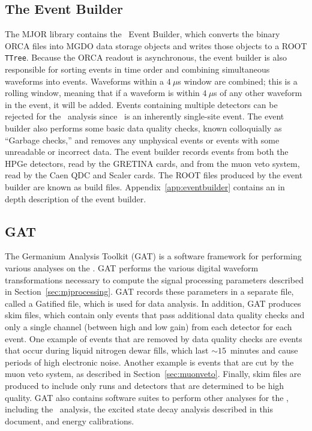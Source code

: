 \documentclass[/main.tex]{subfiles}
\begin{document}
\subsection{The Event Builder}\label{sec:eventbuilder}
The MJOR library contains the \MJ\ Event Builder, which converts the binary ORCA files into MGDO data storage objects and writes those objects to a ROOT \texttt{TTree}.
Because the ORCA readout is asynchronous, the event builder is also responsible for sorting events in time order and combining simultaneous waveforms into events.
Waveforms within a $4~\mu$s window are combined; this is a rolling window, meaning that if a waveform is within $4~\mu$s of any other waveform in the event, it will be added.
Events containing multiple detectors can be rejected for the \znbb\ analysis since \znbb\ is an inherently single-site event.
The event builder also performs some basic data quality checks, known colloquially as ``Garbage checks,'' and removes any unphysical events or events with some unreadable or incorrect data.
The event builder records events from both the HPGe detectors, read by the GRETINA cards, and from the muon veto system, read by the Caen QDC and Scaler cards.
The ROOT files produced by the event builder are known as build files.
Appendix~\ref{app:eventbuilder} contains an in depth description of the event builder.

\subsection{GAT}
The Germanium Analysis Toolkit (GAT) is a software framework for performing various analyses on the \MJD.
GAT performs the various digital waveform transformations necessary to compute the signal processing parameters described in Section~\ref{sec:mjprocessing}.
GAT records these parameters in a separate file, called a Gatified file, which is used for data analysis.
In addition, GAT produces skim files, which contain only events that pass additional data quality checks and only a single channel (between high and low gain) from each detector for each event.
One example of events that are removed by data quality checks are events that occur during liquid nitrogen dewar fills, which last $\sim15$~minutes and cause periods of high electronic noise.
Another example is events that are cut by the muon veto system, as described in Section~\ref{sec:muonveto}.
Finally, skim files are produced to include only runs and detectors that are determined to be high quality.
GAT also contains software suites to perform other analyses for the \MJD, including the \znbb\ analysis, the excited state decay analysis described in this document, and energy calibrations.
\end{document}
